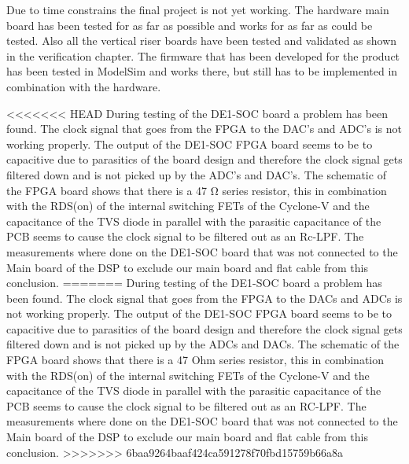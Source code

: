 Due to time constrains the final project is not yet working. The hardware main board has been tested for as far as possible and works for as far as could be tested. Also all the vertical riser boards have been tested and validated as shown in the verification chapter. The firmware that has been developed for the product has been tested in ModelSim and works there, but still has to be implemented in combination with the hardware. 
\par
<<<<<<< HEAD
\noindent During testing of the DE1-SOC board a problem has been found. The clock signal that goes from the FPGA to the DAC's and ADC's is not working properly. The output of the DE1-SOC FPGA board seems to be to capacitive due to parasitics of the board design and therefore the clock signal gets filtered down and is not picked up by the ADC's and DAC's. The schematic of the FPGA board shows that there is a 47 Ω series resistor, this in combination with the RDS(on) of the internal switching FETs of the Cyclone-V and the capacitance of the TVS diode in parallel with the parasitic capacitance of the PCB seems to cause the clock signal to be filtered out as an Rc-LPF. The measurements where done on the DE1-SOC board that was not connected to the Main board of the DSP to exclude our main board and flat cable from this conclusion.
=======
\noindent During testing of the DE1-SOC board a problem has been found. The clock signal that goes from the FPGA to the DACs and ADCs is not working properly. The output of the DE1-SOC FPGA board seems to be to capacitive due to parasitics of the board design and therefore the clock signal gets filtered down and is not picked up by the ADCs and DACs. The schematic of the FPGA board shows that there is a 47 Ohm series resistor, this in combination with the RDS(on) of the internal switching FETs of the Cyclone-V and the capacitance of the TVS diode in parallel with the parasitic capacitance of the PCB seems to cause the clock signal to be filtered out as an RC-LPF. The measurements where done on the DE1-SOC board that was not connected to the Main board of the DSP to exclude our main board and flat cable from this conclusion.
>>>>>>> 6baa9264baaf424ca591278f70fbd15759b66a8a
